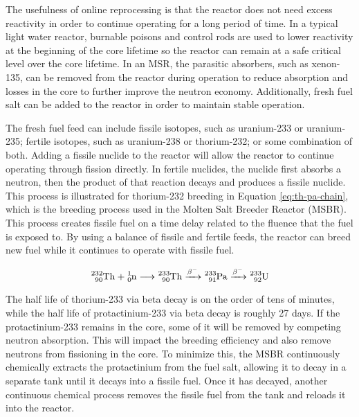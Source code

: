 The usefulness of online reprocessing is that the reactor does not need excess reactivity in order to continue operating for a long period of time.
In a typical light water reactor, burnable poisons and control rods are used to lower reactivity at the beginning of the core lifetime so the reactor can remain at a safe critical level over the core lifetime.
In an MSR, the parasitic absorbers, such as xenon-135, can be removed from the reactor during operation to reduce absorption and losses in the core to further improve the neutron economy.
Additionally, fresh fuel salt can be added to the reactor in order to maintain stable operation.

The fresh fuel feed can include fissile isotopes, such as uranium-233 or uranium-235; fertile isotopes, such as uranium-238 or thorium-232; or some combination of both.
Adding a fissile nuclide to the reactor will allow the reactor to continue operating through fission directly.
In fertile nuclides, the nuclide first absorbs a neutron, then the product of that reaction decays and produces a fissile nuclide. This process is illustrated for thorium-232 breeding in Equation \eqref{eq:th-pa-chain}, which is the breeding process used in the Molten Salt Breeder Reactor (MSBR).
This process creates fissile fuel on a time delay related to the fluence that the fuel is exposed to.
By using a balance of fissile and fertile feeds, the reactor can breed new fuel while it continues to operate with fissile fuel.

\begin{equation} \hfill
\ce{^{232}_{90}Th} + \ce{^{1}_{0}n} \longrightarrow \ce{^{233}_{90}Th} \xrightarrow{\beta^-} \ce{^{233}_{91}Pa} \xrightarrow{\beta^-} \ce{^{233}_{92}U}
\hfill\label{eq:th-pa-chain} \end{equation}

The half life of thorium-233 via beta decay is on the order of tens of minutes, while the half life of protactinium-233 via beta decay is roughly 27 days.
If the protactinium-233 remains in the core, some of it will be removed by competing neutron absorption.
This will impact the breeding efficiency and also remove neutrons from fissioning in the core.
To minimize this, the MSBR continuously chemically extracts the protactinium from the fuel salt, allowing it to decay in a separate tank until it decays into a fissile fuel.
Once it has decayed, another continuous chemical process removes the fissile fuel from the tank and reloads it into the reactor.

